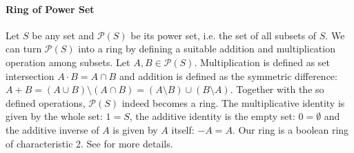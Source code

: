 

\paragraph{Ring of Power Set} Let $S$ be any set and $\mathcal{P}(S)$ be its power set, i.e. the set of all subsets of $S$. We can turn $\mathcal{P}(S)$ into a ring by defining a suitable addition and multiplication operation among subsets. Let $A, B \in \mathcal{P}(S)$. Multiplication is defined as set intersection $A \cdot B = A \cap B$ and addition is defined as the symmetric difference: $A + B = (A \cup B) \setminus (A \cap B) = (A \setminus B) \cup (B \setminus A)$. Together with the so defined operations, $\mathcal{P}(S)$ indeed becomes a ring. The multiplicative identity is given by the whole set: $1 = S$, the additive identity is the empty set: $0 = \emptyset$ and the additive inverse of $A$ is given by $A$ itself: $-A = A$. Our ring is a boolean ring of characteristic 2. See \cite{YT_PowerSetRing} for more details.






